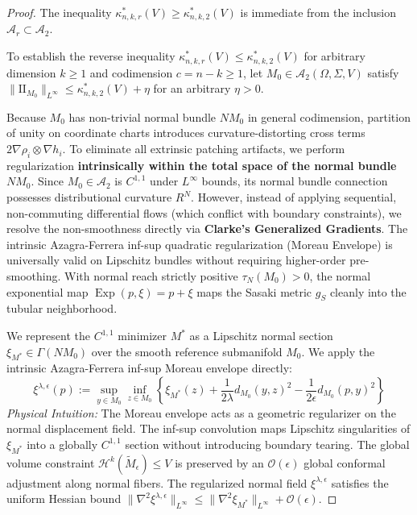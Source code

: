 \documentclass[11pt,reqno]{amsart}
\theoremstyle{definition}
\providecommand{\II}{\mathrm{I\!I}}
\providecommand{\Hsn}{\mathcal{H}}
\numberwithin{equation}{section}
\providecommand{\II}{\mathrm{II}}
\providecommand{\Hsn}{\mathcal{H}}
\begin{document}
\begin{proof}
The inequality $\kappa^*_{n,k,r}(V) \geq \kappa^*_{n,k,2}(V)$ is immediate from the inclusion $\mathcal{A}_r \subset \mathcal{A}_2$.

To establish the reverse inequality $\kappa^*_{n,k,r}(V) \le \kappa^*_{n,k,2}(V)$ for arbitrary dimension $k \ge 1$ and codimension $c = n-k \ge 1$, let $M_0 \in \mathcal{A}_2(\Omega, \Sigma, V)$ satisfy $\|\II_{M_0}\|_{L^\infty} \le \kappa^*_{n,k,2}(V) + \eta$ for an arbitrary $\eta > 0$. 

Because $M_0$ has non-trivial normal bundle $NM_0$ in general codimension, partition of unity on coordinate charts introduces curvature-distorting cross terms $2\nabla\rho_i \otimes \nabla h_i$. To eliminate all extrinsic patching artifacts, we perform regularization \textbf{intrinsically within the total space of the normal bundle} $NM_0$.
Since $M_0 \in \mathcal{A}_2$ is $C^{1,1}$ under $L^\infty$ bounds, its normal bundle connection possesses distributional curvature $R^N$. However, instead of applying sequential, non-commuting differential flows (which conflict with boundary constraints), we resolve the non-smoothness directly via \textbf{Clarke's Generalized Gradients}. The intrinsic Azagra-Ferrera inf-sup quadratic regularization (Moreau Envelope) \cite{azagra2007, lasry1986} is universally valid on Lipschitz bundles without requiring higher-order pre-smoothing.
With normal reach strictly positive $\tau_N(M_0) > 0$, the normal exponential map $\operatorname{Exp}(p, \xi) = p + \xi$ maps the Sasaki metric $g_S$ cleanly into the tubular neighborhood.

We represent the $C^{1,1}$ minimizer $M^*$ as a Lipschitz normal section $\xi_{M^*} \in \Gamma(NM_0)$ over the smooth reference submanifold $M_0$. We apply the intrinsic Azagra-Ferrera inf-sup Moreau envelope directly:
\begin{equation}
\xi^{\lambda, \epsilon}(p) := \sup_{y \in M_0} \inf_{z \in M_0} \left\{ \xi_{M^*}(z) + \frac{1}{2\lambda} d_{M_0}(y, z)^2 - \frac{1}{2\epsilon} d_{M_0}(p, y)^2 \right\}
\end{equation}
\emph{Physical Intuition:} The Moreau envelope acts as a geometric regularizer on the normal displacement field. The inf-sup convolution maps Lipschitz singularities of $\xi_{M^*}$ into a globally $C^{1,1}$ section without introducing boundary tearing. The global volume constraint $\Hsn^k(\tilde{M}_\epsilon) \le V$ is preserved by an $\mathcal{O}(\epsilon)$ global conformal adjustment along normal fibers. The regularized normal field $\xi^{\lambda, \epsilon}$ satisfies the uniform Hessian bound $\|\nabla^2 \xi^{\lambda, \epsilon}\|_{L^\infty} \le \|\nabla^2 \xi_{M^*}\|_{L^\infty} + \mathcal{O}(\epsilon)$.


\end{proof}
\end{document}

